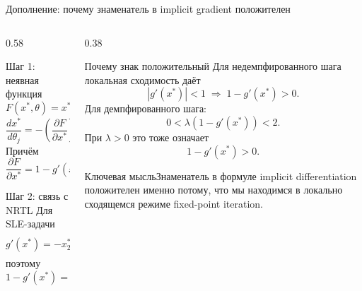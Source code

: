 \documentclass[aspectratio=169,10pt]{beamer}
\newcommand{\keybox}[1]{\begin{block}{Ключевая мысль}#1\end{block}}
\begin{document}
\begin{frame}{Дополнение: почему знаменатель в implicit gradient положителен}
  \small
  \begin{columns}[T,onlytextwidth]
    \begin{column}{0.58\textwidth}
      \begin{block}{Шаг 1: неявная функция}
        \scriptsize
        \[
          F(x^*,\theta)=x^*-g(x^*;\theta)=0,
        \]
        \[
          \frac{dx^*}{d\theta_j}
          =
          -\left(\frac{\partial F}{\partial x^*}\right)^{-1}
          \frac{\partial F}{\partial\theta_j}.
        \]
        Причём
        \[
          \frac{\partial F}{\partial x^*}
          =1-g'(x^*).
        \]
      \end{block}
      \begin{block}{Шаг 2: связь с NRTL}
        \scriptsize
        Для SLE-задачи
        \[
          g'(x^*)=-x_2^*\,\eta,
          \qquad
          \eta=\frac{\partial\ln\gamma_2}{\partial x_2}\Big|_{x_2^*},
        \]
        поэтому
        \[
          1-g'(x^*) = 1+x_2^*\eta.
        \]
      \end{block}
    \end{column}
    \begin{column}{0.38\textwidth}
      \begin{block}{Почему знак положительный}
        \scriptsize
        Для недемпфированного шага локальная сходимость даёт
        \[
          |g'(x^*)|<1
          \;\Longrightarrow\;
          1-g'(x^*)>0.
        \]
        Для демпфированного шага:
        \[
          0<\lambda(1-g'(x^*))<2.
        \]
        При $\lambda>0$ это тоже означает
        \[
          1-g'(x^*)>0.
        \]
      \end{block}
      \keybox{\scriptsize Знаменатель в формуле implicit differentiation положителен именно потому, что мы находимся в локально сходящемся режиме fixed-point iteration.}
    \end{column}
  \end{columns}
\end{frame}
\end{document}
